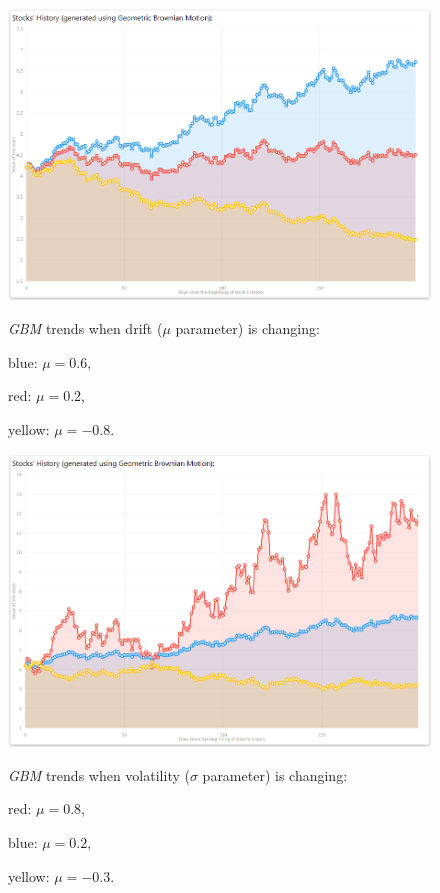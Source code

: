         \begin{figure}[H]
            \centering
            \includegraphics[width=\textwidth]{img/gbm_dri_06_02andm08.png}
            \caption{\textit{GBM} trends when drift ($\mu$ parameter) is changing:}
            \caption*{blue: $\mu = 0.6$,}
            \caption*{red: $\mu = 0.2$,}
            \caption*{yellow: $\mu = -0.8$.}
            \label{fig:gbm_dri}
        \end{figure}
        
        \begin{figure}[H]
            \centering
            \includegraphics[width=\textwidth]{img/gbm_vol_08_02andm03.png}
            \caption{\textit{GBM} trends when volatility ($\sigma$ parameter) is changing:}
            \caption*{red: $\mu = 0.8$,}
            \caption*{blue: $\mu = 0.2$,}
            \caption*{yellow: $\mu = -0.3$.}
            \label{fig:gbm_vol}
        \end{figure}
    
